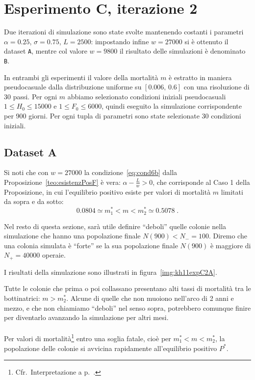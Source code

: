 \section{Esperimento C, iterazione 2}
Due iterazioni di simulazione sono state svolte mantenendo costanti i parametri $\alpha = 0.25$, $\sigma=0.75$,
$L=2500$: impostando infine $w=27000$ si è ottenuto il dataset \texttt{A}, mentre col valore
$w=9800$ il risultato delle simulazioni è denominato \texttt{B}.

In entrambi gli esperimenti il valore della mortalità $m$ è estratto in maniera pseudocasuale dalla distribuzione
uniforme su $[0.006, \, 0.6]$
con una risoluzione di 30 passi.
Per ogni $m$ abbiamo selezionato condizioni iniziali pseudocasuali $1 \leq H_0 \leq 15000$ e
$1 \leq F_0 \leq 6000$, quindi eseguito la simulazione corrispondente per 900 giorni.
Per ogni tupla di parametri sono state selezionate 30 condizioni iniziali.

\subsection{Dataset A}
\label{sec:kh11expC2A}
Si noti che con $w=27000$ la condizione~\eqref{eq:cond6b} dalla Proposizione~\ref{teo:esistenzPosF} è vera:
$\alpha - \frac{L}{w} > 0$, che corrisponde al Caso 1 della Proposizione,
in cui l'equilibrio positivo esiste per valori di mortalità $m$ limitati da sopra e da sotto:
$$ 0.0804 \simeq m_1^* < m < m_2^* \simeq 0.5078 \; .$$

Nel resto di questa sezione, sarà utile definire ``deboli'' quelle colonie nella simulazione che hanno
una popolazione finale $N(900) < N_- = 100$.
Diremo che una colonia simulata è ``forte'' se la sua popolazione finale $N(900)$
è maggiore di $N_+ = 40000$ operaie.

I risultati della simulazione sono illustrati in figura~\ref{img:kh11expC2A}.

Tutte le colonie che prima o poi collassano presentano alti tassi di mortalità tra le bottinatrici: $m > m_2^*$.
Alcune di quelle che non muoiono nell'arco di 2 anni e mezzo, e che non chiamiamo ``deboli'' nel senso sopra,
potrebbero comunque finire per diventarlo avanzando la simulazione per altri mesi.

\paragraph{}
Per valori di mortalità\footnote{Cfr.~Interpretazione a p.~\pageref{par:interpretationCond6b}.}
entro una soglia fatale, cioè per $m_1^* < m < m_2^*$,
la popolazione delle colonie si avvicina rapidamente all'equilibrio positivo $P^*$.

